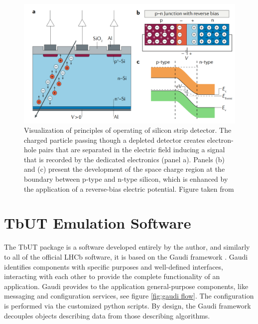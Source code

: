 \begin{figure}[h]
\centering
\includegraphics{figures/silicon_detector.png}
\caption{Visualization of principles of operating of silicon strip detector. The charged particle passing though a depleted detector creates electron-hole pairs that are separated in the electric field inducing a signal that is recorded by the dedicated electronics (panel a). Panels (b) and (c) present the development of the space charge region at the boundary between p-type and n-type silicon, which is enhanced by the application of a reverse-bias electric potential. Figure taken from \cite{silicon_nature}}
\label{fig:silicon_det}
\end{figure}




\section{TbUT Emulation Software}
The TbUT package is a software developed entirely by the author, and similarly to all of the official LHCb software, it is based on the Gaudi framework \cite{gaudi}. Gaudi identifies components with specific purposes and well-defined interfaces, interacting with each other to provide the complete functionality of an application. Gaudi provides to the application general-purpose components, like messaging and configuration services, see figure \ref{fig:gaudi flow}. The configuration is performed via the customized python scripts. By design, the Gaudi framework decouples objects describing data from those describing algorithms.



